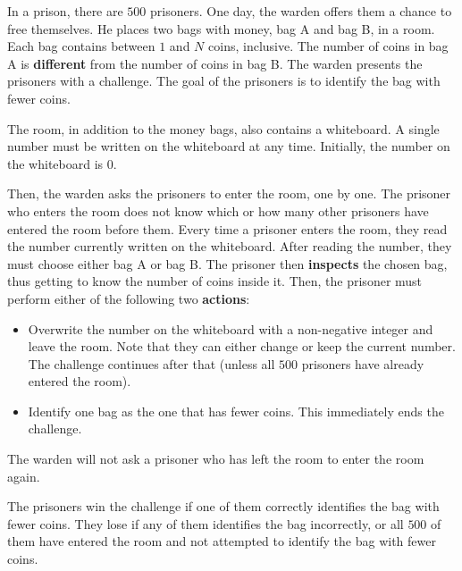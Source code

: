 In a prison, there are $500$ prisoners.
One day, the warden offers them a chance to free themselves.
He places two bags with money, bag A and bag B, in a room.
Each bag contains between $1$ and $N$ coins, inclusive.
The number of coins in bag A is \textbf{different} from the number of coins in bag B.
The warden presents the prisoners with a challenge.
The goal of the prisoners is to identify the bag with fewer coins.

The room, in addition to the money bags, also contains a whiteboard.
A single number must be written on the whiteboard at any time.
Initially, the number on the whiteboard is $0$.

Then, the warden asks the prisoners to enter the room, one by one.
The prisoner who enters the room does not know which or how many other prisoners have entered the room before them.
Every time a prisoner enters the room, they read the number currently written on the whiteboard.
After reading the number, they must choose either bag A or bag B.
The prisoner then \textbf{inspects} the chosen bag, thus getting to know the number of coins inside it.
Then, the prisoner must perform either of the following two \textbf{actions}:
\begin{itemize}
    \item Overwrite the number on the whiteboard with a non-negative integer and leave the room.
Note that they can either change or keep the current number.
The challenge continues after that (unless all $500$ prisoners have already entered the room).
    \item Identify one bag as the one that has fewer coins. This immediately ends the challenge.
\end{itemize}


The warden will not ask a prisoner who has left the room to enter the room again.

The prisoners win the challenge if one of them correctly identifies the bag with fewer coins.
They lose if any of them identifies the bag incorrectly, or all $500$ of them have entered the room and not attempted to identify the bag with fewer coins.

